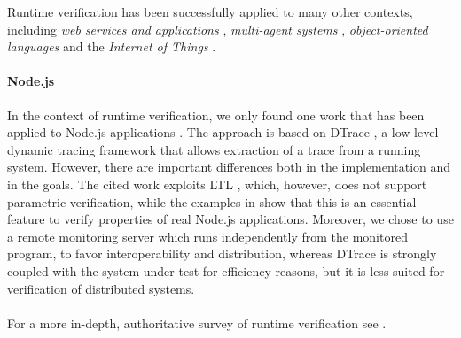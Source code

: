 Runtime verification has been successfully applied to many other contexts, including \emph{web services and applications} \cite{webservices, webapps}, \emph{multi-agent systems} \cite{AnconaDM12}, \emph{object-oriented languages} \cite{pql, javadynamic, de2014combining, BoerEtAl14} and the \emph{Internet of Things} \cite{rviot1, rviot2}.

\paragraph{Node.js}
In the context of runtime verification, we only found one work that has been applied to Node.js applications \cite{Rosenberg2016}.
The approach is based on DTrace \cite{dtrace}, a low-level dynamic tracing framework that allows extraction of a trace from a running system.
However, there are important differences both in the implementation and in the goals.
The cited work exploits LTL \cite{ltl}, which, however, does not support parametric verification, while the examples
in  show that this is an essential feature to verify properties of real Node.js applications.
Moreover, we chose to use a remote monitoring server which runs independently from the monitored program, to favor interoperability and
distribution, whereas DTrace is strongly coupled with the system under test for efficiency reasons, but it is
less suited for verification of distributed systems. 

\paragraph*{}
For a more in-depth, authoritative survey of runtime verification see \cite{rv}.
